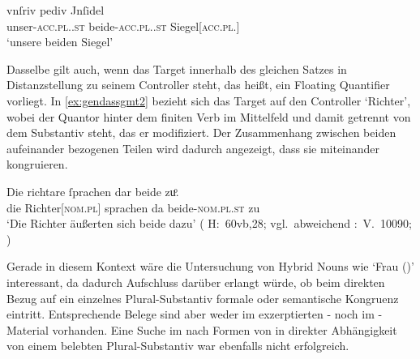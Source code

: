 \begin{exe}
\ex \label{ex:gendassgmt1_txt}
	\gll vnſriv pediv Jnſidel \\
		unser-\textsc{acc.pl.\NeutI.st} beide-\textsc{acc.pl.\NeutI.st}
			Siegel[\textsc{acc.pl.\NeutI}] \\
	\trans `unsere beiden Siegel'
		\parencites(Nr.~3224~A, Freising, 1299)[400,12--13]{cao4}
\end{exe}


Dasselbe gilt auch, wenn das Target innerhalb des gleichen Satzes in
Distanzstellung zu seinem Controller steht, das heißt, ein Floating Quantifier
vorliegt. In \cref{ex:gendassgmt2} bezieht sich das Target  auf den
Controller  `Richter', wobei der Quantor hinter dem finiten Verb
im Mittelfeld und damit getrennt von dem Substantiv steht, das er modifiziert.
Der Zusammenhang zwischen beiden aufeinander bezogenen Teilen wird dadurch
angezeigt, dass sie miteinander kongruieren.

\begin{exe}
\ex \label{ex:gendassgmt2}
	\gll Die richtare ſprachen dar beide zuͦ. \\
		die Richter[\textsc{nom.pl\subM}] sprachen da
		beide-\textsc{nom.pl\subM.st} zu \\
	\trans `Die Richter äußerten sich beide dazu'
		(%
			H:~60vb,28; vgl.~abweichend
			\KC:~V.~10090;
			\cite[267]{schroeder1895}%
		)
\end{exe}

Gerade in diesem Kontext wäre die Untersuchung von Hybrid Nouns wie 
`Frau (\NeutF)' interessant, da dadurch Aufschluss darüber erlangt würde, ob
beim direkten Bezug auf ein einzelnes Plural-Substantiv formale oder
semantische Kongruenz eintritt. Entsprechende Belege sind aber weder im
exzerptierten \CAO{}- noch im \KC{}-Material vorhanden. Eine Suche im \REM{}
nach Formen von  in direkter Abhängigkeit von einem belebten
Plural-Substantiv war ebenfalls nicht erfolgreich.

